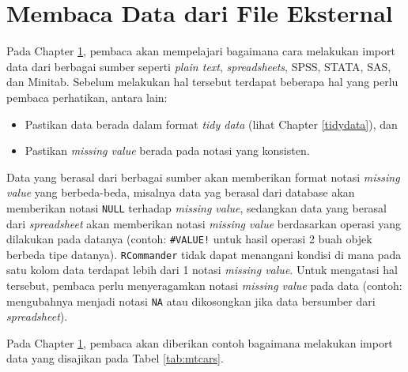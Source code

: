\documentclass[12pt,]{krantz}
\providecommand{\tightlist}{%
  \setlength{\itemsep}{0pt}\setlength{\parskip}{0pt}}
\begin{document}
\hypertarget{impeks}{%
\section{Membaca Data dari File Eksternal}\label{impeks}}

Pada Chapter \ref{impeks}, pembaca akan mempelajari bagaimana cara melakukan import data dari berbagai sumber seperti \emph{plain text}, \emph{spreadsheets}, SPSS, STATA, SAS, dan Minitab. Sebelum melakukan hal tersebut terdapat beberapa hal yang perlu pembaca perhatikan, antara lain:

\begin{itemize}
\tightlist
\item
  Pastikan data berada dalam format \emph{tidy data} (lihat Chapter \ref{tidydata}), dan
\item
  Pastikan \emph{missing value} berada pada notasi yang konsisten.
\end{itemize}

Data yang berasal dari berbagai sumber akan memberikan format notasi \emph{missing value} yang berbeda-beda, misalnya data yag berasal dari database akan memberikan notasi \texttt{NULL} terhadap \emph{missing value}, sedangkan data yang berasal dari \emph{spreadsheet} akan memberikan notasi \emph{missing value} berdasarkan operasi yang dilakukan pada datanya (contoh: \texttt{\#VALUE!} untuk hasil operasi 2 buah objek berbeda tipe datanya). \texttt{RCommander} tidak dapat menangani kondisi di mana pada satu kolom data terdapat lebih dari 1 notasi \emph{missing value}. Untuk mengatasi hal tersebut, pembaca perlu menyeragamkan notasi \emph{missing value} pada data (contoh: mengubahnya menjadi notasi \texttt{NA} atau dikosongkan jika data bersumber dari \emph{spreadsheet}).

Pada Chapter \ref{impeks}, pembaca akan diberikan contoh bagaimana melakukan import data yang disajikan pada Tabel \ref{tab:mtcars}.
\end{document}
